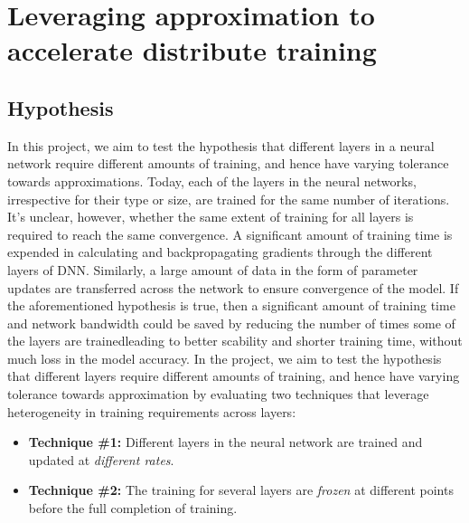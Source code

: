 \section{Leveraging approximation to accelerate distribute training}
\subsection{Hypothesis}
In this project, we aim to test the hypothesis that different layers in a neural network require different amounts of training, and hence have varying tolerance towards approximations. Today, each of the layers in the neural networks, irrespective for their type or size, are trained for the same number of iterations. It's unclear, however, whether the same extent of training for all layers is required to reach the same convergence. A significant amount of training time is expended in calculating and backpropagating gradients through the different layers of DNN. Similarly, a large amount of data in the form of parameter updates are transferred across the network to ensure convergence of the model. If the aforementioned hypothesis is true, then a significant amount of training time and network bandwidth could be saved by reducing the number of times some of the layers are trained{\textemdash}leading to better scability and shorter training time, without much loss in the model accuracy. In the project, we aim to test the hypothesis that different layers require different amounts of training, and hence have varying tolerance towards approximation by evaluating two techniques that leverage heterogeneity in training requirements across layers:                
\begin{itemize}
\item \textbf{Technique \#1:} Different layers in the neural network are trained and updated at \emph{different rates}.
\item \textbf{Technique \#2:} The training for several layers are \emph{frozen} at different points before the full completion of training. 
\end{itemize}

